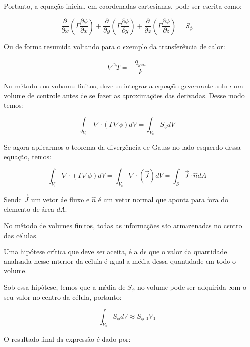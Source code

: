 Portanto, a equação inicial, em coordenadas cartesianas, pode ser escrita como:

\begin{equation}
    \frac{\partial}{\partial x} \left( \Gamma \frac{\partial \phi}{\partial x} \right) + \frac{\partial}{\partial y} \left( \Gamma \frac{\partial \phi}{\partial y} \right) + \frac{\partial}{\partial z} \left( \Gamma \frac{\partial \phi}{\partial z} \right) = S_\phi
\end{equation}

Ou de forma resumida voltando para o exemplo da transferência de calor:

\begin{equation}
    \nabla^2 T= -\frac{\dot{q}_{gen}}{k}
\end{equation}

No método dos volumes finitos, deve-se integrar a equação governante sobre um volume de controle antes de se fazer as aproximações das derivadas. Desse modo temos:

\begin{equation}
    \int_{V_0} \nabla \cdot (\Gamma \nabla \phi) dV = \int_{V_0} S_\phi dV
\end{equation}

Se agora aplicarmos o teorema da divergência de Gauss no lado esquerdo dessa equação, temos:

\begin{equation}
    \int_{V_0} \nabla \cdot (\Gamma \nabla \phi) dV = \int_{V_0} \nabla \cdot (\vec{J}) dV = \int_S \vec{J} \cdot \hat{n} dA
\end{equation}

Sendo $\vec{J}$ um vetor de fluxo e $\hat{n}$ é um vetor normal que aponta para fora do elemento de área $dA$.

No método de volumes finitos, todas as informações são armazenadas no centro das células.

Uma hipótese crítica que deve ser aceita, é a de que o valor da quantidade analisada nesse interior da célula é igual a média dessa quantidade em todo o volume.

Sob essa hipótese, temos que a média de $S_\phi$ no volume pode ser adquirida com o seu valor no centro da célula, portanto:

\begin{equation}
    \int_{V_0} S_\phi dV \approx S_{\phi,0} V_0
\end{equation}

O resultado final da expressão é dado por:

